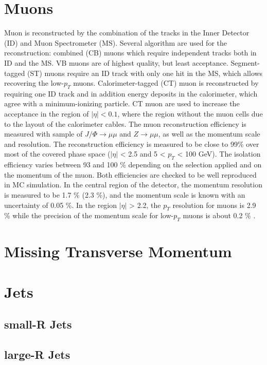 \section{Muons}
Muon is reconstructed by the combination of the tracks in the Inner Detector (ID) and Muon Spectrometer (MS). Several algorithm are used for the reconstruction: combined (CB) muons which require independent tracks both in ID and the MS. VB muons are of highest quality, but least acceptance. Segment-tagged (ST) muons require an ID track with only one hit in the MS, which allows recovering the low-$p_T$ muons. Calorimeter-tagged (CT) muon is reconstructed by requiring one ID track and in addition energy deposits in the calorimeter, which agree with a minimum-ionizing particle. CT muon are used to increase the acceptance in the region of $|\eta| < 0.1$, where the region without the muon cells due to the layout of the calorimeter cables. 
The muon reconstruction efficiency is measured with sample of $J/\Phi \rightarrow \mu\mu$ and $Z\rightarrow \mu\mu$, as well as the momentum scale and resolution.
The reconstruction efficiency is measured to be close to 99\% over most of the covered phase space ($|\eta|$ < 2.5 and 5 < $p_{T}$ < 100 GeV). The isolation efficiency varies between 93 and 100 \% depending on the selection applied and on the momentum of the muon. Both efficiencies are checked to be well reproduced in MC simulation. 
In the central region of the detector, the momentum resolution is measured to be 1.7 \% (2.3 \%), and the momentum scale is known with an uncertainty of 0.05 \%. In the region $|\eta|$ > 2.2, the $p_T$ resolution for muons is 2.9 \% while the precision of the momentum scale for low-$p_T$ muons is about 0.2 \% \cite{}.
\section{Missing Transverse Momentum}

\section{Jets}
\subsection{small-R Jets}
\subsection{large-R Jets}


